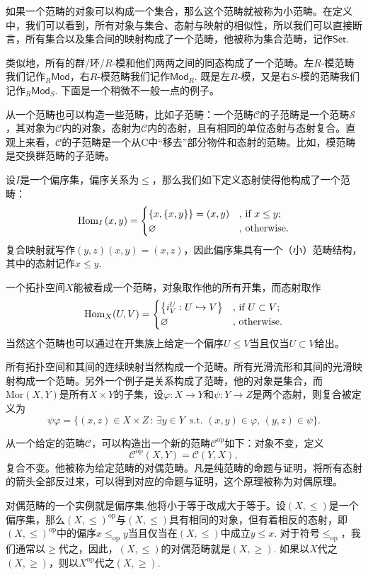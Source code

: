 如果一个范畴的对象可以构成一个集合，那么这个范畴就被称为小范畴。在定义中，我们可以看到，所有对象与集合、态射与映射的相似性，所以我们可以直接断言，所有集合以及集合间的映射构成了一个范畴，他被称为集合范畴，记作$\mathsf{Set}$.

类似地，所有的群/环/$R$-模和他们两两之间的同态构成了一个范畴。左$R$-模范畴我们记作${}_R\mathsf{Mod}$，右$R$-模范畴我们记作$\mathsf{Mod}_R$. 既是左$R$-模，又是右$S$-模的范畴我们记作${}_R\mathsf{Mod}_S$. 下面是一个稍微不一般一点的例子。

从一个范畴也可以构造一些范畴，比如子范畴：一个范畴$\mathcal{C}$的子范畴是一个范畴$\mathcal{S}$，其对象为$\mathcal{C}$内的对象，态射为$\mathcal{C}$内的态射，且有相同的单位态射与态射复合。直观上来看，$\mathcal{C}$的子范畴是一个从C中“移去”部分物件和态射的范畴。比如，模范畴是交换群范畴的子范畴。

\para 设$I$是一个偏序集，偏序关系为$\leq$，那么我们如下定义态射使得他构成了一个范畴：
\[
	\operatorname{Hom}_{I}\left(x,y\right)=\begin{cases}
	\{x,\{x,y\}\}=(x,y)&\text{, if }x\leq y\text{;}\\
	\varnothing&\text{, otherwise}.
	\end{cases}
\]
复合映射就写作$(y,z)(x,y)=(x,z)$，因此偏序集具有一个（小）范畴结构，其中的态射记作$x\leq y$.

一个拓扑空间$X$能被看成一个范畴，对象取作他的所有开集，而态射取作
\[
	\operatorname{Hom}_{X}(U,V)=\begin{cases}
	\bigl\{i^U_V:U\hookrightarrow V\bigr\}&\text{, if }U\subset V\text{;}\\
	\varnothing&\text{, otherwise}.
	\end{cases}
\]
当然这个范畴也可以通过在开集族上给定一个偏序$U\leq V$当且仅当$U\subset V$给出。

所有拓扑空间和其间的连续映射当然构成一个范畴。所有光滑流形和其间的光滑映射构成一个范畴。另外一个例子是关系构成了范畴，他的对象是集合，而$\text{Mor}(X,Y)$是所有$X\times Y$的子集，设$\varphi:X\to Y$和$\psi:Y\to Z$是两个态射，则复合被定义为
\[
	\psi\varphi=\bigl\{(x,z)\in X\times Z\,:\,\exists y\in Y\,\text{ s.t. } (x,y)\in\varphi,\, (y,z)\in \psi\bigr\}.
\]

\para 从一个给定的范畴$\mathcal{C}$，可以构造出一个新的范畴$\mathcal{C}^{\mathrm{op}}$如下：对象不变，定义
\[\mathcal{C}^{\mathrm{op}}(X,Y)=\mathcal{C}(Y,X),\]复合不变。他被称为给定范畴的对偶范畴。凡是纯范畴的命题与证明，将所有态射的箭头全部反过来，可以得到对应的命题与证明，这个原理被称为对偶原理。

对偶范畴的一个实例就是偏序集,他将小于等于改成大于等于。设$(X,\leq)$是一个偏序集，那么$(X,\leq)^\text{op}$与$(X,\leq)$具有相同的对象，但有着相反的态射，即$(X,\leq)^\text{op}$中的偏序$x\leq_{\text{op}} y$当且仅当在$(X,\leq)$中成立$y\leq x$. 对于符号$\leq_{\text{op}}$，我们通常以$\geq$代之，因此，$(X,\leq)$的对偶范畴就是$(X,\geq)$. 如果以$X$代之$(X,\geq)$，则以$X^{\text{op}}$代之$(X,\geq)$.

